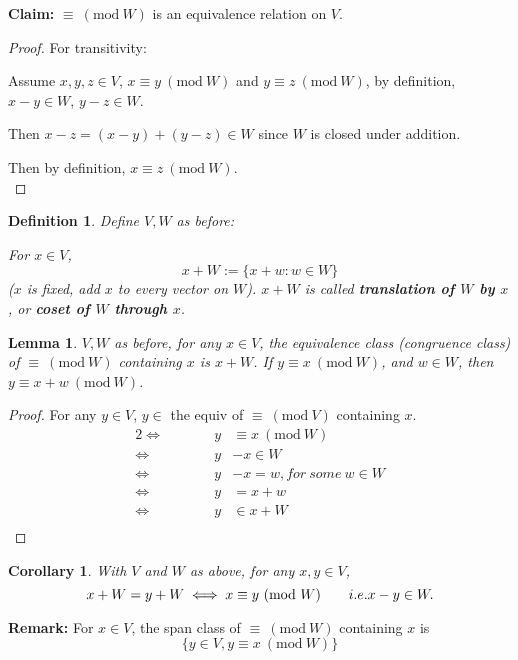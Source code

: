 \documentclass[12pt]{article}
\theoremstyle{plain}
\newtheorem{definition}{Definition}[subsection]
\newtheorem{lemma}{Lemma}[subsection]
\newtheorem{corollary}{Corollary}[subsection]
\newcommand{\Mod}[1]{\ (\mathrm{mod}\ #1)}
\begin{document}
	\textbf{Claim: }$\equiv \Mod W$ is an equivalence relation on $V$. 
	\begin{proof}
		For transitivity: 

		Assume $x, y, z \in V$, $x \equiv y \Mod W$ and $y \equiv z \Mod W$,
		by definition, $x - y \in W$, $y-z\in W$. 

		Then $x - z = (x - y) + (y - z) \in W$ since $W$ is closed under 
		addition. 

	Then by definition, $x \equiv z \Mod W$.\\
	\end{proof}

	\begin{definition}
		Define $V, W$ as before: 
		
		For $x \in V$, 
		\[
			x + W :=\{x + w: w \in W\}
		\]
		($x$ is fixed, add $x$ to every vector on $W$).
		$x + W$ is called \textbf{translation of $W$ by $x$}, or 
		\textbf{coset of $W$ through $x$}. \\
	\end{definition}

	\begin{lemma}
	 $V, W$ as before, for any $x \in V$, the equivalence class
	(congruence class) of $\equiv \Mod W$ containing $x$ is $x + W$. 
	If $y \equiv x \Mod W$, and $w \in W$, then $y \equiv x + w \Mod W$. 
	\end{lemma}
	\begin{proof}
		For any $y \in V$, $y \in$ the equiv of $\equiv \Mod V$ containing $x$.
		\begin{alignat*}{2}
			\iff& \qquad & y & \equiv x \Mod W	\\
			\iff& \qquad & y & - x \in W		\\
			\iff& \qquad & y & - x = w, for \ some \ w \in W\\
			\iff& \qquad & y & = x + w\\
			\iff& \qquad & y & \in x + W\\ 
	\end{alignat*}
	\end{proof}

	\begin{corollary}
		With $V$ and $W$ as above, for any $x, y \in V$, 
		\[
			x + W = y + W \iff x \equiv y \Mod W \qquad i.e. x - y \in W. \\
		\]
	\end{corollary}

	\textbf{Remark:} For $x \in V$, the span class of $\equiv \Mod W$ 
	containing $x$ is 
	\[
		\{y \in V, y\equiv x \Mod W\}
	\]
\end{document}
